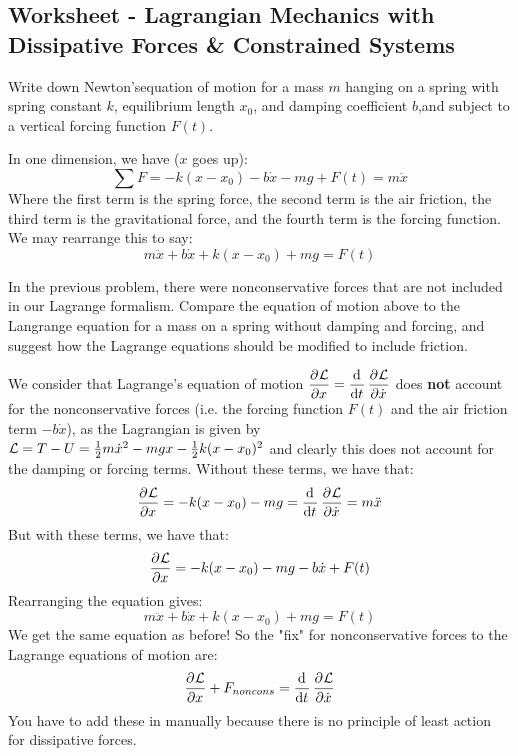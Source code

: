 \subsection{Worksheet - Lagrangian Mechanics with Dissipative Forces \& Constrained Systems}
\begin{p}Write down Newton’sequation of motion for a mass $m$ hanging on a spring with spring constant $k$, equilibrium length $x_0$, and damping coefficient $b$,and subject to a vertical forcing function $F(t)$.
\end{p}
\begin{s}
In one dimension, we have ($x$ goes up):
\[\sum F = -k(x-x_0) - b\dot{x} - mg + F(t) = m\ddot{x}\]
Where the first term is the spring force, the second term is the air friction, the third term is the gravitational force, and the fourth term is the forcing function. We may rearrange this to say:
\[m\ddot{x} + b\dot{x} + k(x-x_0) + mg = F(t)\]

\end{s}
\begin{p}
In the previous problem, there were nonconservative forces that are not included in our Lagrange formalism. Compare the equation of motion above to the Langrange equation for a mass on a spring without damping and forcing, and suggest how the Lagrange equations should be modified to include friction.
\end{p}
\begin{s}
We consider that Lagrange's equation of motion $\dpd{\LL}{x} = \dod{}{t}\dpd{\LL}{\dot{x}}$ does \textbf{not} account for the nonconservative forces (i.e. the forcing function $F(t)$ and the air friction term $-b\dot{x}$), as the Lagrangian is given by $\mathcal{L} = T - U = \frac{1}{2}m\dot{x}^2 - mgx - \frac{1}{2}k(x-x_0)^2$ and clearly this does not account for the damping or forcing terms. Without these terms, we have that:
\[\dpd{\LL}{x} = -k(x - x_0) - mg = \dod{}{t}\dpd{\LL}{\dot{x}} = m\ddot{x}\]
But with these terms, we have that:
\[\dpd{\LL}{x} = -k(x - x_0) - mg - b\dot{x} + F(t)\]
Rearranging the equation gives:
\[m\ddot{x} + b\dot{x} + k(x-x_0) + mg = F(t)\]
We get the same equation as before!
So the "fix" for nonconservative forces to the Lagrange equations of motion are:
\[\dpd{\LL}{x} + F_{noncons} = \dod{}{t}\dpd{\LL}{\dot{x}}\]
You have to add these in manually because there is no principle of least action for dissipative forces.

\end{s}

